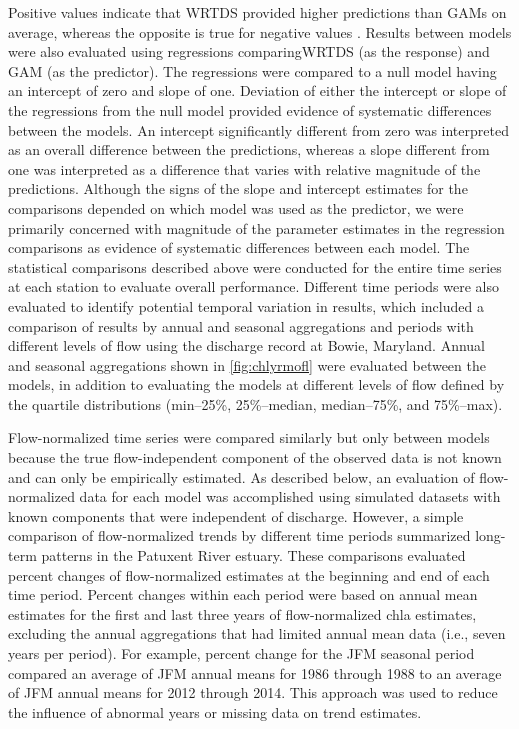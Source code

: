 \documentclass{svjour3}\usepackage[]{graphicx}\usepackage[]{color}
\begin{document}
Positive values indicate that \ac{WRTDS} provided higher predictions than \acp{GAM} on average, whereas the opposite is true for negative values \cite{Moyer12}.  Results between models were also evaluated using regressions comparing\ac{WRTDS} (as the response) and \ac{GAM} (as the predictor).  The regressions were compared to a null model having an intercept of zero and slope of one.  Deviation of either the intercept or slope of the regressions from the null model provided evidence of systematic differences between the models.  An intercept significantly different from zero was interpreted as an overall difference between the predictions, whereas a slope different from one was interpreted as a difference that varies with relative magnitude of the predictions. Although the signs of the slope and intercept estimates for the comparisons depended on which model was used as the predictor, we were primarily concerned with magnitude of the parameter estimates in the regression comparisons as evidence of systematic differences between each model. The statistical comparisons described above were conducted for the entire time series at each station to evaluate overall performance.  Different time periods were also evaluated to identify potential temporal variation in results, which included a comparison of results by annual and seasonal aggregations and periods with different levels of flow using the discharge record at Bowie, Maryland.  Annual and seasonal aggregations shown in \cref{fig:chlyrmofl} were evaluated between the models, in addition to evaluating the models at different levels of flow defined by the quartile distributions (min--25\%, 25\%--median, median--75\%, and 75\%--max).

Flow-normalized time series were compared similarly but only between models because the true flow-independent component of the observed data is not known and can only be empirically estimated.  As described below, an evaluation of flow-normalized data for each model was accomplished using simulated datasets with known components that were independent of discharge.  However, a simple comparison of flow-normalized trends by different time periods summarized long-term patterns in the Patuxent River estuary.  These comparisons evaluated percent changes of flow-normalized estimates at the beginning and end of each time period.  Percent changes within each period were based on annual mean estimates for the first and last three years of flow-normalized \ac{chla} estimates, excluding the annual aggregations that had limited annual mean data (i.e., seven years per period).  For example, percent change for the \ac{JFM} seasonal period compared an average of JFM annual means for 1986 through 1988 to an average of JFM annual means for 2012 through 2014. This approach was used to reduce the influence of abnormal years or missing data on trend estimates.   
\end{document}
